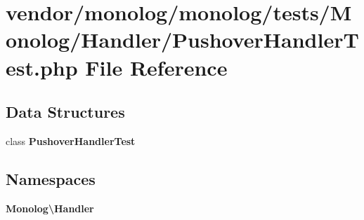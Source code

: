 \section{vendor/monolog/monolog/tests/\+Monolog/\+Handler/\+Pushover\+Handler\+Test.php File Reference}
\label{_pushover_handler_test_8php}
\subsection*{Data Structures}
\begin{DoxyCompactItemize}
\item 
class {\bf Pushover\+Handler\+Test}
\end{DoxyCompactItemize}
\subsection*{Namespaces}
\begin{DoxyCompactItemize}
\item 
 {\bf Monolog\textbackslash{}\+Handler}
\end{DoxyCompactItemize}
